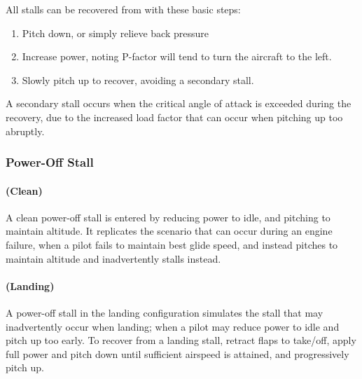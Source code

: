 \documentclass[12pt]{article}
\begin{document}
		All stalls can be recovered from with these basic steps:
		\begin{enumerate}
			\item Pitch down, or simply relieve back pressure
			\item Increase power, noting P-factor will tend to turn the aircraft to the left.
			\item Slowly pitch up to recover, avoiding a secondary stall.
		\end{enumerate}

		A secondary stall occurs when the critical angle of attack is exceeded during the recovery, due to the increased load factor that can occur when pitching up too abruptly.

		\subsubsection{Power-Off Stall}
		\paragraph{(Clean)}
		A clean power-off stall is entered by reducing power to idle, and pitching to maintain altitude. It replicates the scenario that can occur during an engine failure, when a pilot fails to maintain best glide speed, and instead pitches to maintain altitude and inadvertently stalls instead.

		\paragraph{(Landing)} A power-off stall in the landing configuration simulates the stall that may inadvertently occur when landing; when a pilot may reduce power to idle and pitch up too early. To recover from a landing stall, retract flaps to take/off, apply full power and pitch down until sufficient airspeed is attained, and progressively pitch up.\\
\end{document}
